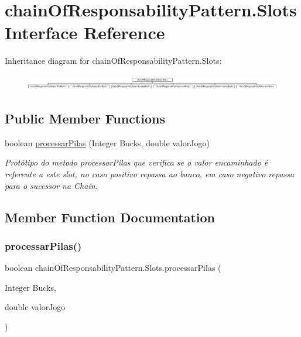 \hypertarget{interfacechain_of_responsability_pattern_1_1_slots}{}\section{chain\+Of\+Responsability\+Pattern.\+Slots Interface Reference}
\label{interfacechain_of_responsability_pattern_1_1_slots}
Inheritance diagram for chain\+Of\+Responsability\+Pattern.\+Slots\+:\begin{figure}[H]
\begin{center}
\leavevmode
\includegraphics[height=0.688807cm]{interfacechain_of_responsability_pattern_1_1_slots}
\end{center}
\end{figure}
\subsection*{Public Member Functions}
\begin{DoxyCompactItemize}
\item 
boolean \mbox{\hyperlink{interfacechain_of_responsability_pattern_1_1_slots_ade54039583c4faf4126847fe7c143862}{processar\+Pilas}} (Integer Bucks, double valor\+Jogo)
\begin{DoxyCompactList}\small\item\em Protótipo do metodo processar\+Pilas que verifica se o valor encaminhado é referente a este slot, no caso positivo repassa ao banco, em caso negativo repassa para o sucessor na Chain. \end{DoxyCompactList}\end{DoxyCompactItemize}


\subsection{Member Function Documentation}
\mbox{\label{interfacechain_of_responsability_pattern_1_1_slots_ade54039583c4faf4126847fe7c143862}} 
\subsubsection{\texorpdfstring{processarPilas()}{processarPilas()}}
{\footnotesize\ttfamily boolean chain\+Of\+Responsability\+Pattern.\+Slots.\+processar\+Pilas (\begin{DoxyParamCaption}\item[{Integer}]{Bucks,  }\item[{double}]{valor\+Jogo }\end{DoxyParamCaption})}



